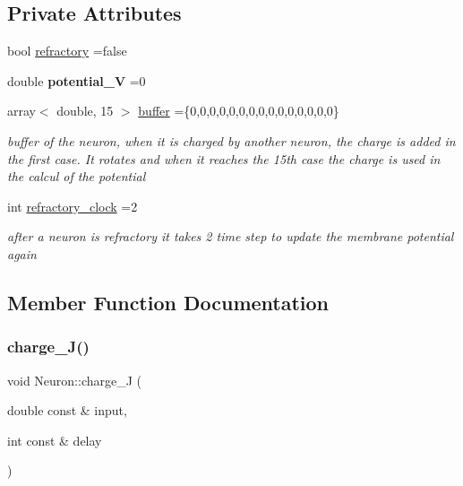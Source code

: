 \subsection*{Private Attributes}
\begin{DoxyCompactItemize}
\item 
bool \hyperlink{class_neuron_aa8becbf43a8a371a89d00ebf9c79ff88}{refractory} =false
\item 
\mbox{\label{class_neuron_adf7e2553c726153c3231de7c33f83228}} 
double {\bfseries potential\+\_\+V} =0
\item 
\mbox{\label{class_neuron_adaa6ad5e0febdab056ed73d59ce45044}} 
array$<$ double, 15 $>$ \hyperlink{class_neuron_adaa6ad5e0febdab056ed73d59ce45044}{buffer} =\{0,0,0,0,0,0,0,0,0,0,0,0,0,0,0\}
\begin{DoxyCompactList}\small\item\em buffer of the neuron, when it is charged by another neuron, the charge is added in the first case. It rotates and when it reaches the 15th case the charge is used in the calcul of the potential \end{DoxyCompactList}\item 
\mbox{\label{class_neuron_a801063d9eebb08d0605743eab1fba11f}} 
int \hyperlink{class_neuron_a801063d9eebb08d0605743eab1fba11f}{refractory\+\_\+clock} =2
\begin{DoxyCompactList}\small\item\em after a neuron is refractory it takes 2 time step to update the membrane potential again \end{DoxyCompactList}\end{DoxyCompactItemize}


\subsection{Member Function Documentation}
\mbox{\label{class_neuron_abfc4d63f88dd429dbd0d9dd379e232a0}} 
\subsubsection{\texorpdfstring{charge\+\_\+\+J()}{charge\_J()}}
{\footnotesize\ttfamily void Neuron\+::charge\+\_\+J (\begin{DoxyParamCaption}\item[{double const \&}]{input,  }\item[{int const \&}]{delay }\end{DoxyParamCaption})}

